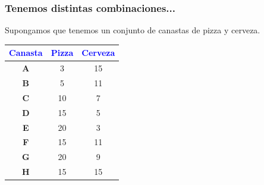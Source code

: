 \documentclass{beamer}
\begin{document}
\begin{frame}
\frametitle{Tenemos distintas combinaciones...}
Supongamos que tenemos un conjunto de canastas de pizza y cerveza. 
\begin{center}
    \renewcommand{\arraystretch}{1.5} %
    \setlength{\arrayrulewidth}{1pt} %
    \setlength{\tabcolsep}{10pt} %
    \begin{tabular}{>{\bfseries}c|c|c}
        \textbf{\textcolor{blue}{Canasta}} & \textbf{\textcolor{blue}{Pizza}} & \textbf{\textcolor{blue}{Cerveza}} \\
        \hline
        A & 3  & 15  \\
        B & 5  & 11  \\
        C & 10 & 7   \\
        D & 15 & 5   \\
        E & 20 & 3   \\
        F & 15 & 11  \\
        G & 20 & 9   \\
        H & 15 & 15  \\
    \end{tabular}
\end{center}
\end{frame}
\end{document}
